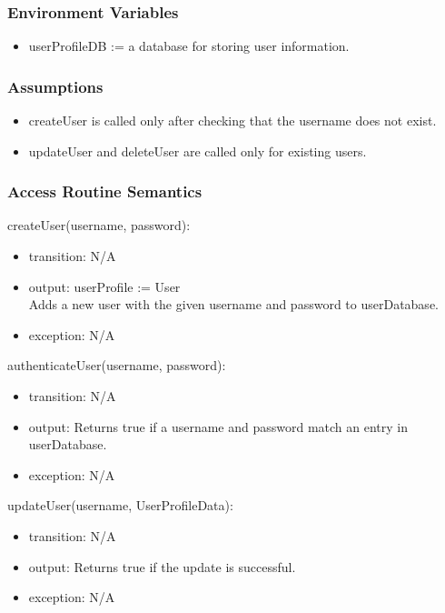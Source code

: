 \documentclass[12pt, titlepage]{article}
\begin{document}
\subsubsection{Environment Variables}
\begin{itemize}
\item userProfileDB := a database for storing user information.
\end{itemize}

\subsubsection{Assumptions}
\begin{itemize}
\item createUser is called only after checking that the username does not exist.
\item updateUser and deleteUser are called only for existing users.

\end{itemize}


\subsubsection{Access Routine Semantics}

\noindent createUser(username, password):
\begin{itemize}
\item transition: N/A
\item output: userProfile := User\\
Adds a new user with the given username and password to userDatabase.
\item exception: N/A
\end{itemize}

\noindent authenticateUser(username, password):
\begin{itemize}
\item transition: N/A
\item output: Returns true if a username and password match an entry in userDatabase.
\item exception: N/A
\end{itemize}

\noindent updateUser(username, UserProfileData):
\begin{itemize}
\item transition: N/A
\item output: Returns true if the update is successful.
\item exception: N/A
\end{itemize}
\end{document}
